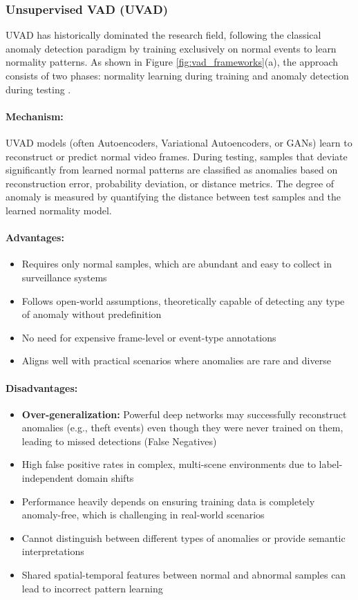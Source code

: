 \documentclass[12pt]{article}
\begin{document}
\subsubsection{Unsupervised VAD (UVAD)}
UVAD has historically dominated the research field, following the classical anomaly detection paradigm by training exclusively on normal events to learn normality patterns. As shown in Figure \ref{fig:vad_frameworks}(a), the approach consists of two phases: normality learning during training and anomaly detection during testing \citep{liu2024networking}.

\paragraph{Mechanism:} 
UVAD models (often Autoencoders, Variational Autoencoders, or GANs) learn to reconstruct or predict normal video frames. During testing, samples that deviate significantly from learned normal patterns are classified as anomalies based on reconstruction error, probability deviation, or distance metrics. The degree of anomaly is measured by quantifying the distance between test samples and the learned normality model.

\paragraph{Advantages:}
\begin{itemize}
    \item Requires only normal samples, which are abundant and easy to collect in surveillance systems
    \item Follows open-world assumptions, theoretically capable of detecting any type of anomaly without predefinition
    \item No need for expensive frame-level or event-type annotations
    \item Aligns well with practical scenarios where anomalies are rare and diverse
\end{itemize}

\paragraph{Disadvantages:}
\begin{itemize}
    \item \textbf{Over-generalization:} Powerful deep networks may successfully reconstruct anomalies (e.g., theft events) even though they were never trained on them, leading to missed detections (False Negatives) \citep{park2020learning}
    \item High false positive rates in complex, multi-scene environments due to label-independent domain shifts
    \item Performance heavily depends on ensuring training data is completely anomaly-free, which is challenging in real-world scenarios
    \item Cannot distinguish between different types of anomalies or provide semantic interpretations
    \item Shared spatial-temporal features between normal and abnormal samples can lead to incorrect pattern learning
\end{itemize}
\end{document}
